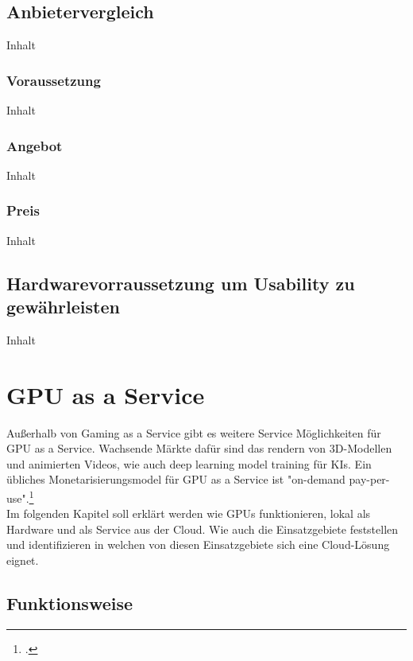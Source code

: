 \documentclass[12pt,toc=bib,toc=listof]{scrreprt}
\begin{document}
\section{Anbietervergleich}
\label{sec:Anbietervergleich}

Inhalt

\subsection{Voraussetzung}
\label{sec:Vorraussetzung}

Inhalt

\subsection{Angebot}
\label{sec:Angebot}

Inhalt

\subsection{Preis}
\label{sec:Preis}

Inhalt

\section{Hardwarevorraussetzung um Usability zu gewährleisten}
\label{sec:Hardwarevorraussetzung um Usability zu gewährleisten}

Inhalt

\chapter{GPU as a Service}
\label{sec:GPU as a Service}

Außerhalb von Gaming as a Service gibt es weitere Service 
Möglichkeiten für GPU as a Service. Wachsende Märkte dafür sind
das rendern von 3D-Modellen und animierten Videos, 
wie auch deep learning model training für KIs. 
Ein übliches Monetarisierungsmodel für GPU as a Service ist "on-demand pay-per-use".\footcite [] [] {Lattuada.2022}
\\Im folgenden Kapitel soll erklärt werden wie GPUs funktionieren, lokal als Hardware und 
als Service aus der Cloud. Wie auch die Einsatzgebiete feststellen und identifizieren in 
welchen von diesen Einsatzgebiete sich eine Cloud-Lösung eignet.

\section{Funktionsweise}
\label{sec: Funktionsweise}
\end{document}
